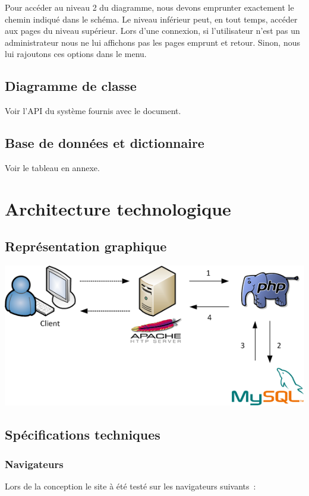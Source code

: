 \documentclass[letter, 10pt]{report}
\begin{document}
Pour accéder au niveau 2 du diagramme, nous devons emprunter exactement le chemin indiqué dans le schéma. Le niveau inférieur peut, en tout temps, accéder aux pages du niveau supérieur.
Lors d'une connexion, si l'utilisateur n'est pas un administrateur nous ne lui affichons pas les pages emprunt et retour. Sinon, nous lui rajoutons ces options dans le menu.

\section{Diagramme de classe}

Voir l'API du système fournis avec le document.

\section{Base de données et dictionnaire}

Voir le tableau en annexe.

\chapter{Architecture technologique}

\section{Représentation graphique}
\includegraphics[scale=0.7]{architectureTechnologique.png}

\section{Spécifications techniques}


\subsection{Navigateurs}
Lors de la conception le site à été testé sur les navigateurs suivants~:
\end{document}
